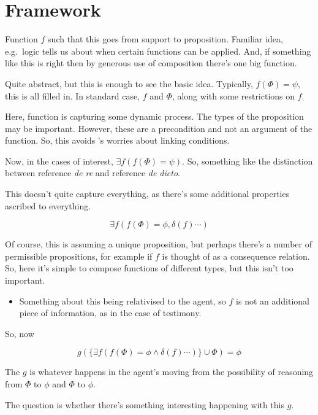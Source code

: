 \documentclass[10pt]{article}
\begin{document}
\section{Framework}
\label{sec:framework}

Function \(f\) such that this goes from support to proposition.
Familiar idea, e.g.\ logic tells us about when certain functions can be applied.
And, if something like this is right then by generous use of composition there's one big function.

Quite abstract, but this is enough to see the basic idea.
Typically, \(f(\Phi) = \psi\), this is all filled in.
In standard case, \(f\) and \(\Phi\), along with some restrictions on \(f\).

Here, function is capturing some dynamic process.
The types of the proposition may be important.
However, these are a precondition and not an argument of the function.
So, this avoids \citeauthor{Broome:2019aa}'s worries about linking conditions.


Now, in the cases of interest, \(\exists f(f(\Phi) = \psi)\).
So, something like the distinction between reference \emph{de re} and reference \emph{de dicto}.

This doesn't quite capture everything, as there's some additional properties ascribed to everything.

\[\exists f(f(\Phi) = \phi, \delta(f) \cdots)\]

Of course, this is assuming a unique proposition, but perhaps there's a number of permissible propositions, for example if \(f\) is thought of as a consequence relation.
So, here it's simple to compose functions of different types, but this isn't too important.

\begin{itemize}
\item Something about this being relativised to the agent, so \(f\) is not an additional piece of information, as in the case of testimony.
\end{itemize}

So, now

\[g(\{\exists f(f(\Phi) = \phi \land \delta(f) \cdots)\} \cup \Phi) = \phi\]

The \(g\) is whatever happens in the agent's moving from the possibility of reasoning from \(\Phi\) to \(\phi\) and \(\Phi\) to \(\phi\).

The question is whether there's something interesting happening with this \(g\).
\end{document}
